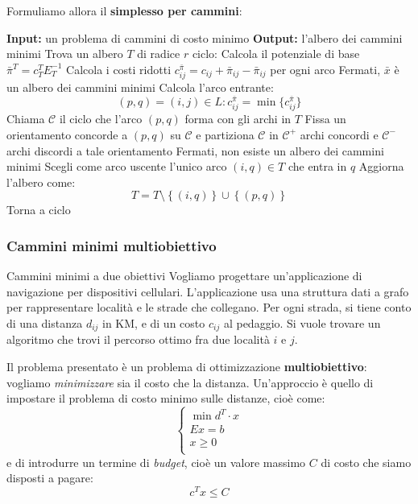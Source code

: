 \documentclass[a4paper,11pt]{article}
\begin{document}
Formuliamo allora il \textbf{simplesso per cammini}:
\begin{algorithm}[H]
\caption{del simplesso per cammini}
\begin{algorithmic}
	\STATE \textbf{Input:} un problema di cammini di costo minimo 
	\STATE \textbf{Output:} l'albero dei cammini minimi 
	\STATE Trova un albero $T$ di radice $r$ 
	\STATE \textsf{ciclo:}
	\STATE Calcola il potenziale di base $\bar{\pi}^T = c_T^T E_T^{-1}$
	\STATE Calcola i costi ridotti $c_{ij}^{\bar{\pi}} = c_{ij} + \bar{\pi}_{ij} - \bar{\pi}_{ij}$ per ogni arco
	\STATE Fermati, $\bar{x}$ è un albero dei cammini minimi 
\ELSE
		\STATE Calcola l'arco entrante: 
		$$
		(p, q) = (i, j) \in L : c_{ij}^{\bar{\pi}} = \min \{ c_{ij}^{\bar{\pi}} \} 
		$$
		\STATE Chiama $\mathcal{C}$ il ciclo che l'arco $(p, q)$ forma con gli archi in $T$
		\STATE Fissa un orientamento concorde a $(p,q)$ su $\mathcal{C}$ e partiziona $\mathcal{C}$ in $\mathcal{C^+}$ archi concordi e $\mathcal{C^-}$ archi discordi a tale orientamento
	\ENDIF
		\STATE Fermati, non esiste un albero dei cammini minimi 
	\ELSE
		\STATE Scegli come arco uscente l'unico arco $(i, q) \in T$ che entra in $q$ 
	\ENDIF
	\STATE Aggiorna l'albero come:
	$$
	T = T \setminus \left\{ (i, q) \right\} \cup \left\{ (p, q) \right\} 
	$$
	\STATE Torna a \textsf{ciclo}
\end{algorithmic}
\end{algorithm}

\subsubsection{Cammini minimi multiobiettivo}
\begin{problem}{Cammini minimi a due obiettivi}
	Vogliamo progettare un'applicazione di navigazione per dispositivi cellulari.
	L'applicazione usa una struttura dati a grafo per rappresentare località e le strade che collegano.
	Per ogni strada, si tiene conto di una distanza $d_{ij}$ in KM, e di un costo $c_{ij}$ al pedaggio.
	Si vuole trovare un algoritmo che trovi il percorso ottimo fra due località $i$ e $j$.
\end{problem}

Il problema presentato è un problema di ottimizzazione \textbf{multiobiettivo}: vogliamo \textit{minimizzare} sia il costo che la distanza.
Un'approccio è quello di impostare il problema di costo minimo sulle distanze, cioè come:
\[
	\begin{cases}
		\min d^T \cdot x \\ 
		Ex = b \\ 
		x \geq 0 \\ 
	\end{cases}
\]
e di introdurre un termine di \textit{budget}, cioè un valore massimo $C$ di costo che siamo disposti a pagare:
$$
c^T x \leq C
$$
\end{document}
